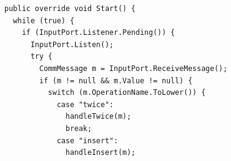 \documentclass[12pt,a4paper]{article}
\begin{document}
\begin{lstlisting}[caption={C\# service start method},label={lst:winServiceSwitch}]
public override void Start() {                                                                                                                                                                                                    
  while (true) {                                                                                                                                                                                                
    if (InputPort.Listener.Pending()) {                                                                                                                                                                                            
      InputPort.Listen();                                                                                                                                                                      
      try {                                                                                                                                                                                        
        CommMessage m = InputPort.ReceiveMessage();                                                                                                                                          
        if (m != null && m.Value != null) {                                                                                                                                                                                    
          switch (m.OperationName.ToLower()) {                                                                                                                                                                                
            case "twice":                                                                                                                                                                
              handleTwice(m);                                                                                                                                                          
              break;                                                                                                                                                                   
            case "insert":                                                                                                                                                               
              handleInsert(m);                                                                                                                                                         

\end{lstlisting}
\end{document}
